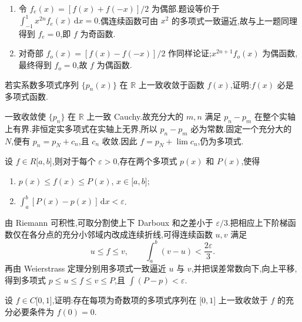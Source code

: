 \begin{solution}
    \leavevmode
    \begin{enumerate}
        \item 令 $f_e(x)=[f(x)+f(-x)]/2$ 为偶部.题设等价于
              $\displaystyle\int_{-1}^{1}x^{2n}f_e(x)\,\mathrm{d}x=0$.偶连续函数可由 $x^2$ 的多项式一致逼近,故与上一题同理得到 $f_e=0$,即 $f$ 为奇函数.
        \item 对奇部 $f_o(x)=[f(x)-f(-x)]/2$ 作同样论证;$x^{2n+1}f_o(x)$ 为偶函数,最终得到 $f_o=0$,故 $f$ 为偶函数.
    \end{enumerate}
\end{solution}

\begin{example}
    若实系数多项式序列 $\{p_n(x)\}$ 在 $\mathbb{R}$ 上一致收敛于函数 $f(x)$,证明:$f(x)$ 必是多项式函数.
\end{example}
\exampleblank

\begin{solution}
    一致收敛使 $\{p_n\}$ 在 $\mathbb{R}$ 上一致 Cauchy.故充分大的 $m,n$ 满足
    $p_n-p_m$ 在整个实轴上有界.非恒定实多项式在实轴上无界,所以
    $p_n-p_m$ 必为常数.固定一个充分大的 $N$,便有 $p_n=p_N+c_n$,且
    $c_n$ 收敛.因此 $f=p_N+\displaystyle\lim c_n$,仍为多项式.
\end{solution}

\begin{example}
    设 $f\in R\lbrack a,b\rbrack$,则对于每个 $\varepsilon>0$,存在两个多项式 $p(x)$ 和 $P(x)$,使得
    \begin{enumerate}
        \item $p(x)\leq f(x)\leq P(x)$, $x\in\lbrack a,b\rbrack$;
        \item $\displaystyle\int_a^b[P(x)-p(x)]\,\mathrm{d}x<\varepsilon$.
    \end{enumerate}
\end{example}
\exampleblank

\begin{solution}
    由 Riemann 可积性,可取分割使上下 Darboux 和之差小于 $\varepsilon/3$.把相应上下阶梯函数仅在各分点的充分小邻域内改成连续折线,可得连续函数 $u,v$ 满足
    \[
        u\leq f\leq v,\qquad \int_a^b(v-u)<\dfrac{2\varepsilon}{3}.
    \]
    再由 Weierstrass 定理分别用多项式一致逼近 $u$ 与 $v$,并把误差常数向下,向上平移,得到多项式 $p\leq u\leq f\leq v\leq P$,且
    $\displaystyle\int(P-p)<\varepsilon$.
\end{solution}

\begin{example}
    设 $f\in C\lbrack 0,1\rbrack$,证明:存在每项为奇数项的多项式序列在 $\lbrack 0,1\rbrack$ 上一致收敛于 $f$ 的充分必要条件为 $f(0)=0$.
\end{example}
\exampleblank

